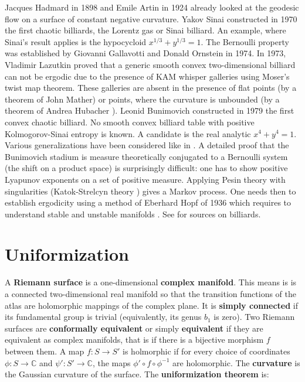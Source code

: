 \documentclass[12pt]{amsart}
\newcounter{example}    \def\example#1{ \item \fontsize{12}{15} \selectfont #1 \fontsize{12}{15} \selectfont }
\begin{document}
Jacques Hadmard in 1898 and Emile Artin in 1924 already 
looked at the geodesic flow on a surface of constant negative curvature. 
Yakov Sinai constructed in 1970 the first chaotic billiards, the Lorentz gas or 
Sinai billiard. An example, where Sinai's result applies is the hypocycloid $x^{1/3} + y^{1/3}=1$.  
The Bernoulli property was established by Giovanni Gallavotti and Donald Ornstein in 1974. 
In 1973, Vladimir Lazutkin proved that a generic smooth convex two-dimensional billiard 
can not be ergodic due to the presence of KAM whisper galleries using Moser's twist map
theorem. These galleries are absent in the presence of flat points (by a theorem of John Mather) 
or points, where the curvature is unbounded (by a theorem of Andrea Hubacher \cite{Hubacher87}). 
Leonid Bunimovich \cite{Bun79} constructed in 1979 the first convex chaotic billiard.
No smooth convex billiard table with positive Kolmogorov-Sinai entropy
is known. A candidate is the real analytic $x^4+y^4=1$. Various generalizations
have been considered like in \cite{Woj86}.
A detailed proof that the Bunimovich stadium is measure theoretically
conjugated to a Bernoulli system (the shift on a product space) 
is surprisingly difficult: one has
to show positive Lyapunov exponents on a set of positive measure. Applying
Pesin theory with singularities (Katok-Strelcyn theory \cite{KatokStrelcyn}) 
gives a Markov process.  One needs then to establish ergodicity using a method of Eberhard Hopf 
of 1936 which requires to understand stable and unstable manifolds 
\cite{ChernovMarkarian}.  
See \cite{Tab95, KozlovTreshchev, MoserVariations, Gole, KH, ChernovMarkarian} for sources on billiards.

\section{Uniformization}

A {\bf Riemann surface} is a one-dimensional {\bf complex manifold}. 
This means is is a connected two-dimensional real manifold so that the transition 
functions of the atlas are holomorphic mappings of the complex plane. 
It is {\bf simply connected} if its fundamental group is trivial (equivalently, its genus
$b_1$ is zero). Two Riemann surfaces are {\bf conformally equivalent} or simply
{\bf equivalent} if they are equivalent as complex manifolds, that is if there is a bijective morphism $f$
between them. A map $f:S \to S'$ is holmorphic if for every choice of coordinates $\phi:S \to \mathbb{C}$
and $\psi':S' \to \mathbb{C}$, the maps $\phi' \circ f \circ \phi^{-1}$ are holomorphic.
The {\bf curvature} is the Gaussian curvature of the surface. The
{\bf uniformization theorem} is:
\end{document}
